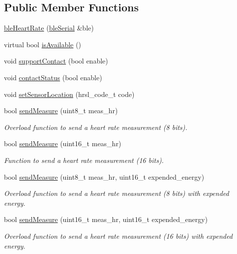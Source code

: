 \subsection*{Public Member Functions}
\begin{DoxyCompactItemize}
\item 
\hyperlink{classble_heart_rate_af5e0bc81b5d2f8e290b6cba8050f80c2}{ble\-Heart\-Rate} (\hyperlink{classble_serial}{ble\-Serial} \&ble)
\item 
virtual bool \hyperlink{classble_heart_rate_a822019806bf50f6d25ae075b62a838ab}{is\-Available} ()
\item 
void \hyperlink{classble_heart_rate_acd5a0148a2df6692893a274a18710431}{support\-Contact} (bool enable)
\item 
void \hyperlink{classble_heart_rate_a4b05ceb33ffe7fcfe9f1a3dbf9679882}{contact\-Status} (bool enable)
\item 
void \hyperlink{classble_heart_rate_a9c822ea4fafcb609e009427feb0949c2}{set\-Sensor\-Location} (hrsl\-\_\-code\-\_\-t code)
\item 
bool \hyperlink{classble_heart_rate_a2b7329b1756f03c99334b6575e14c090}{send\-Measure} (uint8\-\_\-t meas\-\_\-hr)
\begin{DoxyCompactList}\small\item\em Overload function to send a heart rate measurement (8 bits). \end{DoxyCompactList}\item 
bool \hyperlink{classble_heart_rate_a9f69ad22553dabc5b992bf9a15aa6667}{send\-Measure} (uint16\-\_\-t meas\-\_\-hr)
\begin{DoxyCompactList}\small\item\em Function to send a heart rate measurement (16 bits). \end{DoxyCompactList}\item 
bool \hyperlink{classble_heart_rate_ac0bd83937f2997c2451918a421c277c2}{send\-Measure} (uint8\-\_\-t meas\-\_\-hr, uint16\-\_\-t expended\-\_\-energy)
\begin{DoxyCompactList}\small\item\em Overload function to send a heart rate measurement (8 bits) with expended energy. \end{DoxyCompactList}\item 
bool \hyperlink{classble_heart_rate_a34a055d4b926b2447ca78a4f63691d30}{send\-Measure} (uint16\-\_\-t meas\-\_\-hr, uint16\-\_\-t expended\-\_\-energy)
\begin{DoxyCompactList}\small\item\em Overload function to send a heart rate measurement (16 bits) with expended energy. \end{DoxyCompactList}\item 

\end{DoxyCompactItemize}

